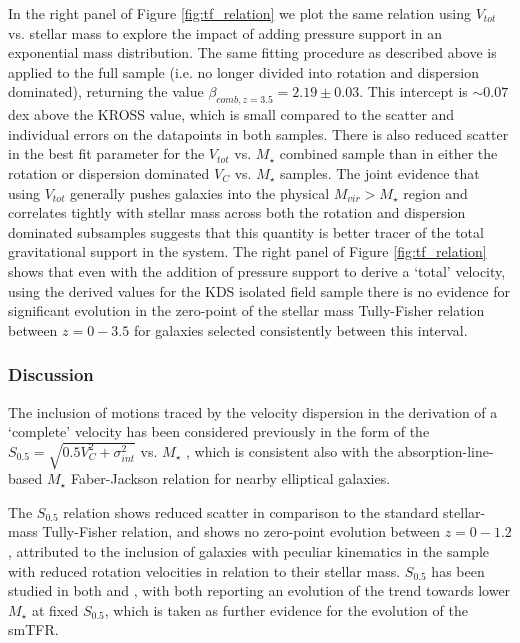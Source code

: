\documentclass[a4paper,fleqn,usenatbib]{mn2e}
\begin{document}
In the right panel of Figure \ref{fig:tf_relation} we plot the same relation using $V_{tot}$ vs. stellar mass to explore the impact of adding pressure support in an exponential mass distribution.
The same fitting procedure as described above is applied to the full sample (i.e. no longer divided into rotation and dispersion dominated), returning the value $\beta_{comb,z=3.5} = 2.19\pm0.03$. 
This intercept is $\sim0.07$ dex above the KROSS value, which is small compared to the scatter and individual errors on the datapoints in both samples.
There is also reduced scatter in the best fit parameter for the $V_{tot}$ vs. $M_{\star}$ combined sample than in either the rotation or dispersion dominated $V_{C}$ vs. $M_{\star}$ samples.
The joint evidence that using $V_{tot}$ generally pushes galaxies into the physical $M_{vir} > M_{\star}$ region and correlates tightly with stellar mass across both the rotation and dispersion dominated subsamples suggests that this quantity is better tracer of the total gravitational support in the system.
The right panel of Figure \ref{fig:tf_relation} shows that even with the addition of pressure support to derive a `total' velocity, using the derived values for the KDS isolated field sample there is no evidence for significant evolution in the zero-point of the stellar mass Tully-Fisher relation between $z=0-3.5$ for galaxies selected consistently between this interval.


\subsubsection{Discussion}\label{subsubsec:tf_discussion}
The inclusion of motions traced by the velocity dispersion in the derivation of a `complete' velocity has been considered previously in the form of the $S_{0.5} = \sqrt{0.5V_{C}^{2} + \sigma_{int}^{2}}$ vs. $M_{\star}$ \citep[e.g.][]{Kassin2007,Kassin2012}, which is consistent also with the absorption-line-based $M_{\star}$ Faber-Jackson relation for nearby elliptical galaxies.

The $S_{0.5}$ relation shows reduced scatter in comparison to the standard stellar-mass Tully-Fisher relation, and shows no zero-point evolution between $z=0-1.2$, attributed to the inclusion of galaxies with peculiar kinematics in the sample with reduced rotation velocities in relation to their stellar mass.
$S_{0.5}$ has been studied in both \cite{Cresci2009} and \cite{Gnerucci2011}, with both reporting an evolution of the \cite{Kassin2007} trend towards lower $M_{\star}$ at fixed $S_{0.5}$, which is taken as further evidence for the evolution of the smTFR.
\end{document}
